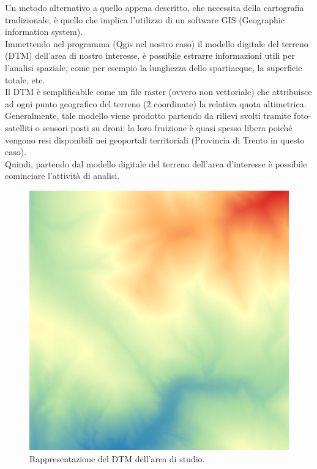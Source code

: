 \noindent Un metodo alternativo a quello appena descritto, che necessita della cartografia tradizionale, è quello che implica l'utilizzo di un software GIS (Geographic information system).\\
Immettendo nel programma (Qgis nel nostro caso) il modello digitale del terreno (DTM) dell'area di nostro interesse, è possibile estrarre informazioni utili per l'analisi spaziale, come per esempio la lunghezza dello spartiacque, la superficie totale, etc.\\
Il DTM è semplificabile come un file raster (ovvero non vettoriale) che attribuisce ad ogni punto geografico del terreno (2 coordinate) la relativa quota altimetrica. Generalmente, tale modello viene prodotto partendo da rilievi svolti tramite foto-satelliti o sensori posti su droni; la loro fruizione è quasi spesso libera poiché vengono resi disponibili nei geoportali territoriali (Provincia di Trento in questo caso).\\
Quindi, partendo dal modello digitale del terreno dell'area d'interesse è possibile cominciare l'attività di analisi.\\
\begin{figure}[H]\centering
    \includegraphics[scale=.50]{immagini/dtm_qgis.PNG}
    \caption{Rappresentazione del DTM dell'area di studio.}
    \label{dtm_qgis}
\end{figure}
